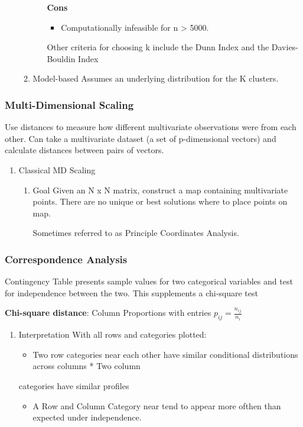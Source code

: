 \documentclass[11pt]{article}
\begin{document}
\begin{enumerate}
\begin{enumerate}
\begin{enumerate}
\textbf{Cons}
\begin{itemize}
\item Computationally infeasible for n > 5000.
\end{itemize}

Other criteria for choosing k include the Dunn Index and the
Davies-Bouldin Index
\end{enumerate}

\item Model-based
\label{sec:orgc6ae294}
Assumes an underlying distribution for the K clusters.
\end{enumerate}
\end{enumerate}

\subsubsection{Multi-Dimensional Scaling}
\label{sec:orgf17bf45}
Use distances to measure how different multivariate observations were
from each other. Can take a multivariate dataset (a set of p-dimensional
vectors) and calculate distances between pairs of vectors.

\begin{enumerate}
\item Classical MD Scaling
\label{sec:org05b515e}
\begin{enumerate}
\item Goal
\label{sec:org62b7cbb}
Given an N x N matrix, construct a map containing multivariate points.
There are no unique or best solutions where to place points on map.

Sometimes referred to as Principle Coordinates Analysis.
\end{enumerate}
\end{enumerate}

\subsubsection{Correspondence Analysis}
\label{sec:orgdf25703}
Contingency Table presents sample values for two categorical variables
and test for independence between the two. This supplements a chi-square
test

\textbf{Chi-square distance}: Column Proportions with entries
\(p_{ij} = \frac{n_{ij}}{n_i}\)

\begin{enumerate}
\item Interpretation
\label{sec:orgfaef80d}
With all rows and categories plotted:
\begin{itemize}
\item Two row categories near each other have similar conditional distributions across columns * Two column
\end{itemize}
categories have similar profiles
\begin{itemize}
\item A Row and Column Category near tend to appear more ofthen than expected under independence.
\end{itemize}
\end{enumerate}
\end{document}
